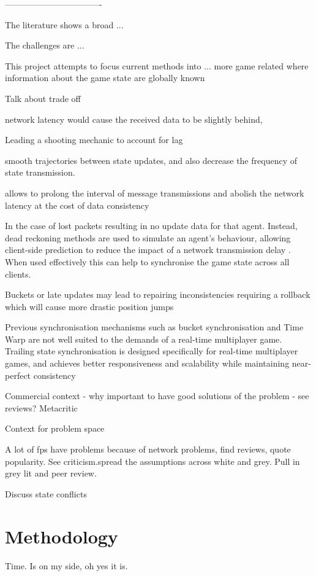 \documentclass[journal]{IEEEtran}
\begin{document}
----------------------------------


The literature shows a broad ...

The challenges are ...

This project attempts to focus current methods into ... more game related where information about the game state are globally known



Talk about trade off

network latency would cause the received data to be slightly behind,

Leading a shooting mechanic to account for lag \cite{bernier2001latency}

smooth trajectories between state updates, and also decrease the frequency of state transmission.

allows to prolong the interval of message transmissions and abolish the network latency at the cost of data consistency \cite{smed2002aspects}

In the case of lost packets resulting in no update data for that agent. Instead, dead reckoning methods are used to simulate an agent's behaviour, allowing client-side prediction to reduce the impact of a network transmission delay \cite{pantel2002suitability}. When used effectively this can help to synchronise the game state across all clients.




Buckets or late updates may lead to repairing inconsistencies requiring a rollback which will cause more drastic position jumps \cite{cronin2002efficient}

Previous synchronisation mechanisms such as bucket synchronisation and Time Warp are not well suited to the demands of a real-time multiplayer game. Trailing state synchronisation is designed specifically for real-time multiplayer games, and achieves better responsiveness and scalability while maintaining near-perfect consistency \cite{cronin2001distributed}

Commercial context - why important to have good solutions of the problem - see reviews? Metacritic

Context for problem space

A lot of fps have problems because of network problems, find reviews, quote popularity. See criticism.spread the assumptions across white and grey. Pull in grey lit and peer review. \cite{solaire2016reddit} \cite{hp2015bungie}


Discuss state conflicts





\section{Methodology}

Time. Is on my side, oh yes it is.








\end{document}
